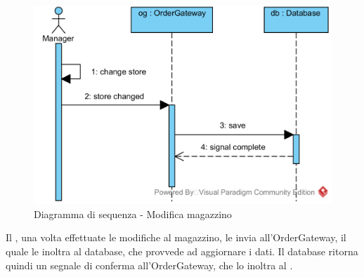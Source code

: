 \begin{figure}[H]
	\centering
	\includegraphics[width=14cm]{../../documenti/SpecificaTecnica/diagrammi_img/sequenza/direttore_modifica_magazzino.png}
	\caption{Diagramma di sequenza - Modifica magazzino}
\end{figure}
Il \Manager{}, una volta effettuate le modifiche al magazzino, le invia all'Order\-Gateway, il quale le inoltra al database, che provvede ad aggiornare i dati. Il database ritorna quindi un segnale di conferma all'Order\-Gateway, che lo inoltra al \Manager{}.



